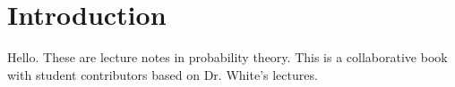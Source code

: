 \documentclass[../main.tex]{subfiles}
\begin{document}
\chapter{Introduction}

Hello. These are lecture notes in probability theory. This is a collaborative book
with student contributors based on Dr. White's lectures.
\end{document}
